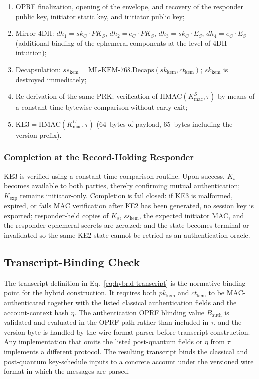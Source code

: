 \documentclass[preprint,12pt]{elsarticle}
\theoremstyle{remark}
\begin{document}
\begin{enumerate}
  \item OPRF finalization, opening of the envelope, and recovery of the
        responder public key, initiator static key, and initiator public
        key;
  \item Mirror 4DH:
        $dh_1 = sk_C \cdot PK_S$,
        $dh_2 = e_C \cdot PK_S$, $dh_3 = sk_C \cdot E_S$,
        $dh_4 = e_C \cdot E_S$ (additional binding of the ephemeral
        components at the level of 4DH intuition);
  \item Decapsulation:
        $ss_{\mathrm{kem}} =
        \mathrm{ML\text{-}KEM\text{-}768.Decaps}(sk_{\mathrm{kem}},
        ct_{\mathrm{kem}})$; $sk_{\mathrm{kem}}$ is destroyed
        immediately;
  \item Re-derivation of the same PRK; verification of
        $\mathrm{HMAC}(K_{\mathrm{mac}}^S, \tau)$ by means of a
        constant-time bytewise comparison without early exit;
  \item $\mathrm{KE3} = \mathrm{HMAC}(K_{\mathrm{mac}}^C, \tau)$
        (64~bytes of payload, 65~bytes including the version prefix).
\end{enumerate}

\subsubsection{Completion at the Record-Holding Responder}

KE3 is verified using a constant-time comparison routine. Upon success,
$K_s$ becomes available to both parties, thereby confirming mutual
authentication; $K_{\mathrm{exp}}$ remains initiator-only. Completion is fail closed: if KE3 is
malformed, expired, or fails MAC verification after KE2 has been
generated, no session key is exported; responder-held copies of $K_s$,
$ss_{\mathrm{kem}}$, the expected initiator MAC, and the
responder ephemeral secrets are zeroized; and the state becomes
terminal or invalidated so the same KE2 state cannot be retried as an
authentication oracle.

\subsection{Transcript-Binding Check}

The transcript definition in Eq.~\eqref{eq:hybrid-transcript} is the
normative binding point for the hybrid construction. It requires both
$pk_{\mathrm{kem}}$ and $ct_{\mathrm{kem}}$ to be MAC-authenticated
together with the listed classical authentication fields and the
account-context hash $\eta$. The authentication OPRF blinding value
$B_{\mathrm{auth}}$ is validated and evaluated in the OPRF path rather
than included in $\tau$, and the version byte is handled by the
wire-format parser before transcript construction. Any implementation
that omits the listed post-quantum fields or $\eta$ from $\tau$
implements a different protocol. The resulting transcript binds the
classical and post-quantum key-schedule inputs to a concrete account
under the versioned wire format in which the messages are parsed.
\end{document}
